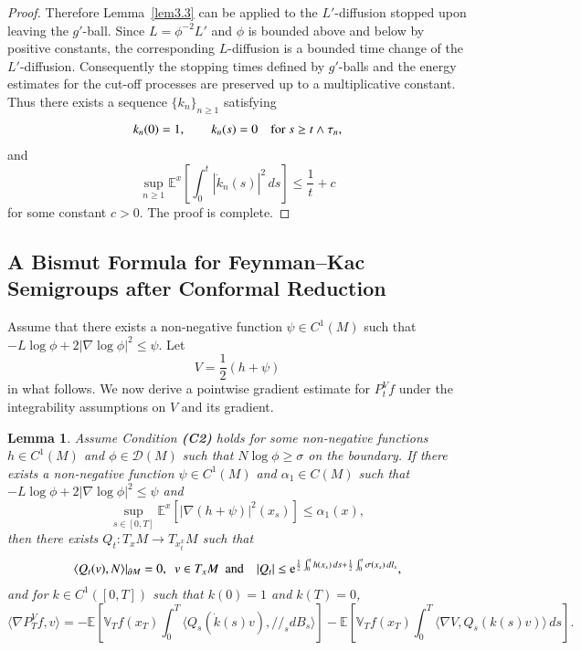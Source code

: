 \documentclass[11pt,twoside, reqno]{article}
\def\r{\right}
\def\l{\left}
\def\ptr {/\!/}
\def\e{{\rm e}}
\newcommand\1{\mathbbm{1}}
\newtheorem{lemma}[theorem]{Lemma}
\theoremstyle{definition}
\numberwithin{equation}{section}
\def \e{{\rm e}}
\begin{document}
\begin{proof}
Therefore Lemma~\ref{lem3.3} can be applied to the \(L'\)-diffusion stopped
upon leaving the \(g'\)-ball. Since \(L=\phi^{-2}L'\) and \(\phi\) is bounded
above and below by positive constants, the corresponding \(L\)-diffusion is a
bounded time change of the \(L'\)-diffusion. Consequently the stopping times
defined by \(g'\)-balls and the energy estimates for the cut-off processes
are preserved up to a multiplicative constant. Thus there exists a sequence
\(\{k_n\}_{n\geq1}\) satisfying
\[
        k_n(0)=1,
        \qquad
        k_n(s)=0 \quad \hbox{for } s\geq t\wedge\tau_n,
\]
and
\[
        \sup_{n\geq1}
        \mathbb E^x\left[\int_0^t |\dot k_n(s)|^2\,ds\right]
        \leq
        \frac1t+c
\]
for some constant \(c>0\). The proof is complete.
\end{proof}


\subsection{A Bismut Formula for Feynman--Kac Semigroups after Conformal Reduction}
Assume that there exists a non-negative function $\psi\in C^1(M)$ such that 
$- L \log \phi + 2|\nabla \log \phi|^2\leq \psi$.  Let 
$$V = \frac12 (h +\psi) $$
in what follows. 
We now derive a pointwise gradient estimate for \(P_t^V f\) under the integrability assumptions on \(V\) and its gradient.

\begin{lemma}\label{lem0-0}
Assume Condition {\bf (C2)} holds for some non-negative functions \( h \in C^1(M) \) and \( \phi \in \mathcal{D}(M) \)  such that  \( N \log \phi \geq \sigma \) on the boundary. If there exists a non-negative function $\psi\in C^1(M)$ and $\alpha_1\in C(M)$ such that 
$- L \log \phi + 2|\nabla \log \phi|^2\leq \psi$ and
\[
\sup_{s \in [0,T]} \mathbb{E}^x \left[ \left| \nabla (h+\psi)  \right|^2 (x_s) \right] \leq \alpha_1(x),
\]  
then  there exists \( Q_t : T_xM \to T_{x_t^x}M \) such that
\begin{align*}
\langle Q_t(v), N \rangle |_{\partial M} =0, \ \  v\in T_x M\ \ \mbox{and}\quad |Q_t|\leq \e^{\frac{1}{2}\int_0^t h(x_s)\,ds +\frac{1}{2}\int_0^t \sigma(x_s)\,dl_s },
\end{align*} 
and for $k\in C^1([0,T])$ such that $k(0)=1$ and $k(T)=0$, 
\[
\langle \nabla P_T^V f, v \rangle = 
-\mathbb{E} \l[ \mathbb{V}_T f(x_T) \int_0^T \langle Q_s (\dot{k}(s) v), \ptr_s dB_s \rangle \r] 
- \mathbb{E} \l[ \mathbb{V}_T f(x_T) \int_0^T \langle \nabla V, Q_s (k(s) v) \rangle \, ds \r].
\]  
\end{lemma}
\end{document}
